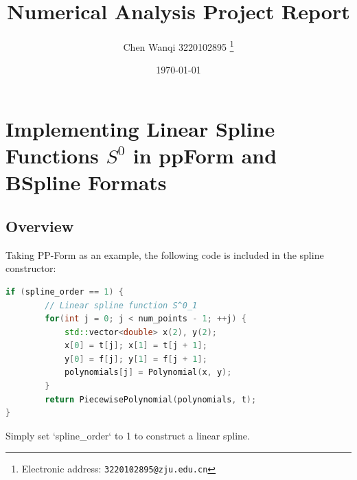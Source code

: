 \documentclass[a4paper]{article}
\begin{document}
\title{Numerical Analysis Project Report}

\author{Chen Wanqi 3220102895
  \thanks{Electronic address: \texttt{3220102895@zju.edu.cn}}}

\date{\today}

\maketitle

\section{Implementing Linear Spline Functions \( S^0 \) in ppForm and BSpline Formats}

\subsection{Overview}
Taking PP-Form as an example, the following code is included in the spline constructor:
\begin{lstlisting}[language=C++]
if (spline_order == 1) {
        // Linear spline function S^0_1
        for(int j = 0; j < num_points - 1; ++j) {
            std::vector<double> x(2), y(2);
            x[0] = t[j]; x[1] = t[j + 1];
            y[0] = f[j]; y[1] = f[j + 1];
            polynomials[j] = Polynomial(x, y);
        }
        return PiecewisePolynomial(polynomials, t);
}
\end{lstlisting}
Simply set `spline\_order` to 1 to construct a linear spline.
\end{document}

